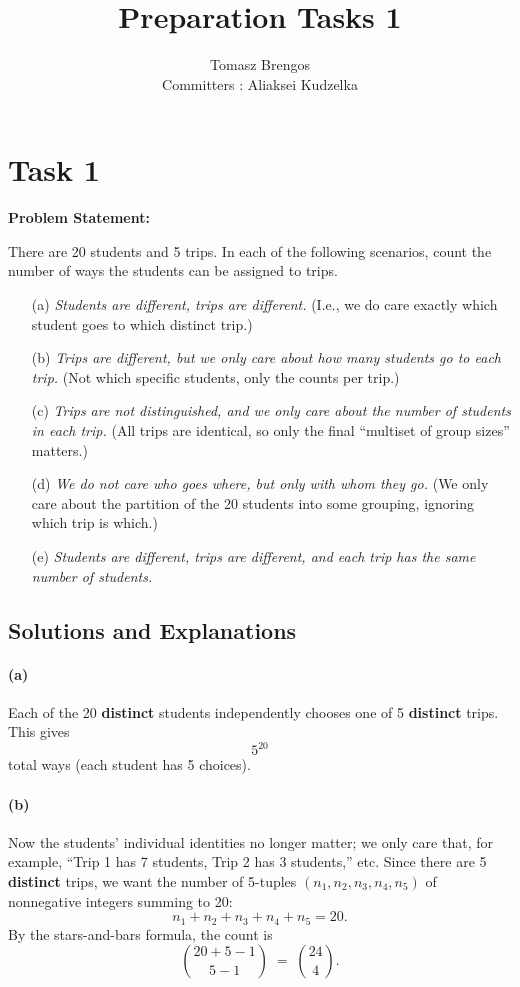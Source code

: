 \documentclass[docmute]{article}
\title{Preparation Tasks 1}
\author{Tomasz Brengos \\  
Committers : Aliaksei Kudzelka}
\date{}
\begin{document}
\maketitle

\section*{Task 1}

\textbf{Problem Statement:}

There are 20 students and 5 trips. In each of the following scenarios, count the number of ways the students can be assigned to trips.

\begin{enumerate}
  \item[(a)] \emph{Students are different, trips are different.} (I.e., we do care exactly which student goes to which distinct trip.)
  \item[(b)] \emph{Trips are different, but we only care about how many students go to each trip.} (Not which specific students, only the counts per trip.)
  \item[(c)] \emph{Trips are not distinguished, and we only care about the number of students in each trip.} (All trips are identical, so only the final ``multiset of group sizes'' matters.)
  \item[(d)] \emph{We do not care who goes where, but only with whom they go.} (We only care about the partition of the 20 students into some grouping, ignoring which trip is which.)
  \item[(e)] \emph{Students are different, trips are different, and each trip has the same number of students.}
\end{enumerate}

\subsection*{Solutions and Explanations}

\paragraph{(a)} 
Each of the 20 \textbf{distinct} students independently chooses one of 5 \textbf{distinct} trips. This gives
\[
5^{20}
\]
total ways (each student has 5 choices).

\paragraph{(b)} 
Now the students’ individual identities no longer matter; we only care that, for example, “Trip 1 has 7 students, Trip 2 has 3 students,” etc. Since there are 5 \textbf{distinct} trips, we want the number of 5-tuples \((n_1, n_2, n_3, n_4, n_5)\) of nonnegative integers summing to 20:
\[
n_1 + n_2 + n_3 + n_4 + n_5 = 20.
\]
By the stars-and-bars formula, the count is
\[
\binom{20 + 5 - 1}{5 - 1} \;=\; \binom{24}{4}.
\]
\end{document}
